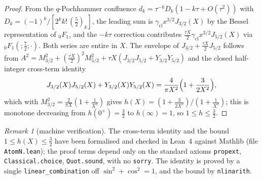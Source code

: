 \documentclass[11pt]{article}
\theoremstyle{plain}
\theoremstyle{definition}
\theoremstyle{remark}
\newtheorem{remark}[theorem]{Remark}
\begin{document}
\begin{proof}
From the $q$-Pochhammer confluence $d_k=\tau^{-k}D_k(1-k\tau+O(\tau^2))$ with
$D_k=(-1)^k/[2^kk!\,(\tfrac52)_k]$, the leading sum is $\gamma_{\mathrm{cl}}x^{3/2}J_{3/2}(X)$ by the
Bessel representation of ${}_0F_1$, and the $-k\tau$ correction contributes
$\tfrac{\tau X}2\gamma_{\mathrm{cl}}x^{3/2}J_{5/2}(X)$ via ${}_0F_1(;\tfrac72;\cdot)$. Both series are
entire in $X$. The envelope of $J_{3/2}+\tfrac{\tau X}2J_{5/2}$ follows from
$A^2=M_{3/2}^2+(\tfrac{\tau X}2)^2M_{5/2}^2+\tau X(J_{3/2}J_{5/2}+Y_{3/2}Y_{5/2})$ and the closed
half-integer cross-term identity
\[
   J_{3/2}(X)J_{5/2}(X)+Y_{3/2}(X)Y_{5/2}(X)=\frac{4}{\pi X^2}\Bigl(1+\frac3{2X^2}\Bigr),
\]
which with $M_{3/2}^2=\tfrac2{\pi X}(1+\tfrac1{X^2})$ gives $h(X)=(1+\tfrac3{2X^2})/(1+\tfrac1{X^2})$;
this is monotone decreasing from $h(0^+)=\tfrac32$ to $h(\infty)=1$, so $1\le h\le\tfrac32$.
\end{proof}

\begin{remark}[machine verification]\label{rem:lean}
The cross-term identity and the bound $1\le h(X)\le\tfrac32$ have been formalised and checked in
Lean~4 against Mathlib (file \texttt{AtomN.lean}); the proof terms depend only on the standard
axioms \texttt{propext}, \texttt{Classical.choice}, \texttt{Quot.sound}, with no \texttt{sorry}.
The identity is proved by a single \texttt{linear\_combination} off $\sin^2+\cos^2=1$, and the bound
by \texttt{nlinarith}.
\end{remark}
\end{document}
